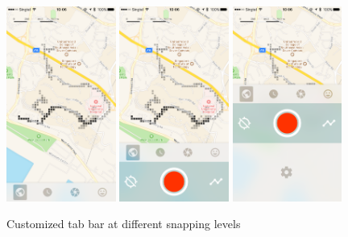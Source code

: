 \documentclass[12pt,a4paper]{article}
\begin{document}
            \begin{figure}
                \includegraphics[width=0.32\textwidth]{4-1-1-a}
                \includegraphics[width=0.32\textwidth]{4-1-1-b}
                \includegraphics[width=0.32\textwidth]{4-1-1-c}
                \centering
                \caption{Customized tab bar at different snapping levels}
                \label{fig:fundamental}
            \end{figure}
            
\end{document}
